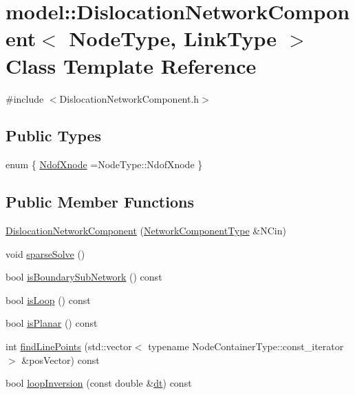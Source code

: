 \hypertarget{classmodel_1_1_dislocation_network_component}{}\section{model\+:\+:Dislocation\+Network\+Component$<$ Node\+Type, Link\+Type $>$ Class Template Reference}
\label{classmodel_1_1_dislocation_network_component}


{\ttfamily \#include $<$Dislocation\+Network\+Component.\+h$>$}

\subsection*{Public Types}
\begin{DoxyCompactItemize}
\item 
enum \{ \hyperlink{classmodel_1_1_dislocation_network_component_ae887ec550c152d1b4ec9b04679b73435a8cb6343a8da1d071229f68db375665a3}{Ndof\+Xnode} =Node\+Type\+:\+:Ndof\+Xnode
 \}
\end{DoxyCompactItemize}
\subsection*{Public Member Functions}
\begin{DoxyCompactItemize}
\item 
\hyperlink{classmodel_1_1_dislocation_network_component_a74ce7162192bfd30a20dd1d3e1e0054c}{Dislocation\+Network\+Component} (\hyperlink{classmodel_1_1_network_component}{Network\+Component\+Type} \&N\+Cin)
\item 
void \hyperlink{classmodel_1_1_dislocation_network_component_a2a43b2b0ea16b264a6319b4c62e278e3}{sparse\+Solve} ()
\item 
bool \hyperlink{classmodel_1_1_dislocation_network_component_a8d4f6e98a4ea4888c93795f7780ef787}{is\+Boundary\+Sub\+Network} () const 
\item 
bool \hyperlink{classmodel_1_1_dislocation_network_component_ac26d36e38c20cfbcaf9654bd374b92a6}{is\+Loop} () const 
\item 
bool \hyperlink{classmodel_1_1_dislocation_network_component_a6c2994b3ef837ede1ad900fb30994955}{is\+Planar} () const 
\item 
int \hyperlink{classmodel_1_1_dislocation_network_component_afae7871f053b0c4c462e421fb110415b}{find\+Line\+Points} (std\+::vector$<$ typename Node\+Container\+Type\+::const\+\_\+iterator $>$ \&pos\+Vector) const 
\item 
bool \hyperlink{classmodel_1_1_dislocation_network_component_a58c5f3e1f553a563e35e18eb16c794c6}{loop\+Inversion} (const double \&\hyperlink{plot_stress_strain_8m_a770f288d3048ff6cbee9faa0969fd6b0}{dt}) const 
\end{DoxyCompactItemize}


